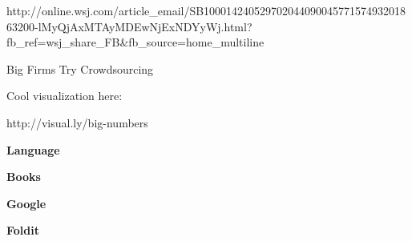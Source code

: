 

http://online.wsj.com/article_email/SB10001424052970204409004577157493201863200-lMyQjAxMTAyMDEwNjExNDYyWj.html?fb_ref=wsj_share_FB&fb_source=home_multiline

Big Firms Try Crowdsourcing

Cool visualization here:

http://visual.ly/big-numbers

  \textbf{Language}
  

  \textbf{Books}
  

  \textbf{Google}
  

  \textbf{Foldit}
  

